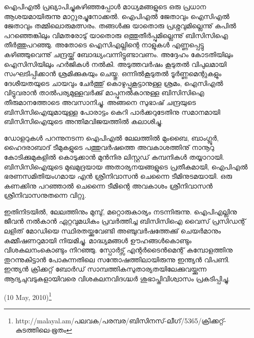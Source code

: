 

ഐപിഎല്‍ പ്രഖ്യാപിച്ചുകഴിഞ്ഞപ്പോള്‍ മാധ്യമങ്ങളുടെ ഒരു പ്രധാന ആശയമായിരുന്നു മാറ്റുരച്ചുനോക്കല്‍. ഐപിഎല്‍ 
ജേതാവും ഐസിഎല്‍ ജേതാവും തമ്മിലൊരുമത്സരം. തങ്ങള്‍ക്കു യാതൊരു പ്രശ്നവുമില്ലെന്നു് കപില്‍ പറഞ്ഞെങ്കിലും 
വിമതരോടു് യാതൊരു ഒത്തുതീര്‍പ്പുമില്ലെന്നു് ബിസിസിഐ തീര്‍ത്തുപറഞ്ഞു. അതോടെ ഐസിഎല്ലിന്റെ നാളുകള്‍ 
എണ്ണപ്പെട്ടു കഴിഞ്ഞുവെന്നു് ചന്ദ്രയ്ക്കു് ബോദ്ധ്യംവന്നിട്ടുണ്ടാവണം. അദ്ദേഹം കോടതിയിലും ഐസിസിയിലും ഹര്‍ജികള്‍ 
നല്‍കി. അടുത്തവര്‍ഷം കൂടുതല്‍ വിപുലമായി സംഘടിപ്പിക്കാന്‍ ശ്രമിക്കുകയും ചെയ്തു. ഒന്നില്‍കൂടുതല്‍ ടൂര്‍ണ്ണമെന്റുകളും 
ദേശീയതയുടെ ചായവും ചേര്‍ത്തു് കൊഴുപ്പുകൂട്ടാനുള്ള ശ്രമം, ഐസിഎല്‍ വിട്ടുവരാന്‍ താല്‍പര്യമുള്ളവര്‍ക്കു് മാപ്പുനല്‍കാനുള്ള 
ബിസിസിഐ തീരുമാനത്തോടെ അവസാനിച്ചു. അങ്ങനെ സുഭാഷ് ചന്ദ്രയുടെ ബിസിസിഐയുമായുള്ള 
പോരാട്ടം കെറി പാര്‍ക്കറുടേതിനു സമാനമായി ബിസിസിഐയുടെ അന്തിമവിജയത്തില്‍ കലാശിച്ചു.

ഡോളറുകള്‍ പറന്നുനടന്ന ഐപിഎല്‍ ലേലത്തില്‍ മുംബൈ, ബാംഗ്ലൂര്‍, ഹൈദരാബാദ് ടീമുകളുടെ പത്തുവര്‍ഷത്തെ 
അവകാശത്തിനു് നാനൂറു കോടിക്കുമുകളില്‍ കൊടുക്കാന്‍ മുന്‍നിര ലിസ്റ്റഡ് കമ്പനികള്‍ തയ്യാറായി. ബിസിസിഐയുടെ 
മുഖമുദ്രയായ അതാര്യനയങ്ങളുടെ പ്രതീകമായി, ഐപിഎല്‍ ഭരണസമിതിയംഗമായ എന്‍ ശ്രീനിവാസന്‍ ചെന്നൈ 
ടീമിനുടമയായി. ഒരു കണക്കിനു പറഞ്ഞാല്‍ ചെന്നൈ ടീമിന്റെ അവകാശം ശ്രീനിവാസന്‍ ശ്രീനിവാസനുതന്നെ വിറ്റു.

ഇതിനിടയില്‍, ലേലത്തിനും മുമ്പു്, മറ്റൊരുകാര്യം നടന്നിരുന്നു. ഐപിഎല്ലിനു ജീവന്‍ നല്‍കാന്‍ ഏറ്റവുമധികം പ്രവര്‍ത്തിച്ച 
ബിസിസിഐ വൈസ് പ്രസിഡന്റ് ലളിത് മോഡിയെ സ്ഥിരതയ്ക്കുവേണ്ടി അഞ്ചുവര്‍ഷത്തേക്കു് ചെയര്‍മാനും കമ്മീഷണറുമായി 
നിയമിച്ചു. മാദ്ധ്യമങ്ങള്‍ ഊഹങ്ങള്‍കൊണ്ടും വിശകലനംകൊണ്ടും നിറഞ്ഞു. സ്പോര്‍ട്സ് 
എന്റര്‍ടൈന്‍മെന്റ് കമ്പോളത്തിനു തുറന്നുകിട്ടാന്‍ പോകുന്നതിലെ സന്തോഷത്തിലായിരുന്നു ഇന്ത്യന്‍ വിപണി. ഇന്ത്യന്‍ ക്രിക്കറ്റ് ബോര്‍ഡ് 
സാമ്പത്തികസുതാര്യതയിലേക്കുവയ്ക്കുന്ന ആദ്യചുവടുകളായിവരെ വിശകലനവിദഗ്ദ്ധര്‍ ശുഭാപ്തിവിശ്വാസം പ്രകടിപ്പിച്ചു.

\begin{flushright}(10 May, 2010)\footnote{http://malayal.am/പലവക/പരമ്പര/ബിസിനസ്-ലീഗ്/5365/ക്രിക്കറ്റ്-കുടത്തിലെ-ഭൂതം}\end{flushright}

\newpage
